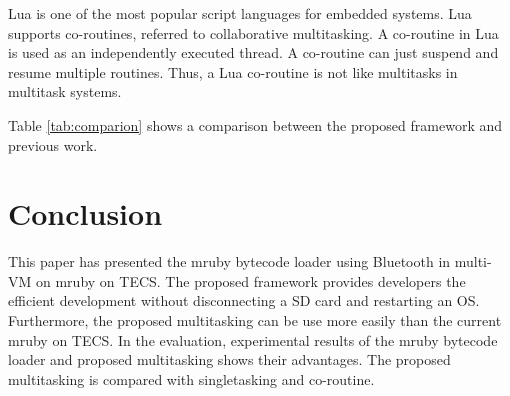 \documentclass[conference,compsoc]{IEEEtran}
\begin{document}
Lua is one of the most popular script languages for embedded systems.
Lua supports co-routines, referred to collaborative multitasking.
A co-routine in Lua is used as an independently executed thread.
A co-routine can just suspend and resume multiple routines. 
Thus, a Lua co-routine is not like multitasks in multitask systems.

Table \ref{tab:comparion} shows a comparison between the proposed framework and previous work.

\section{Conclusion}
\label{sec:Conclusion}
This paper has presented the mruby bytecode loader using Bluetooth in multi-VM on mruby on TECS.
The proposed framework provides developers the efficient development without disconnecting a SD card and restarting an OS.
Furthermore, the proposed multitasking can be use more easily than the current mruby on TECS.
In the evaluation, experimental results of the mruby bytecode loader and proposed multitasking shows their advantages.
The proposed multitasking is compared with singletasking and co-routine.



\end{document}
